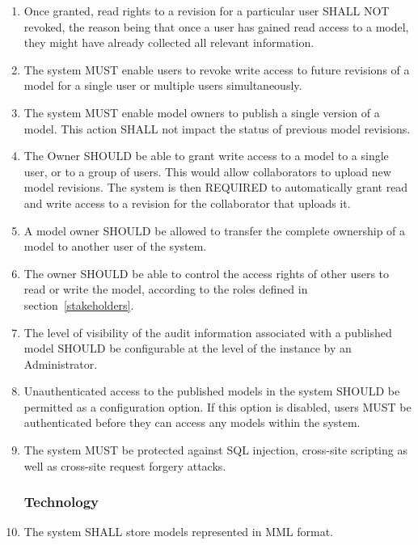 \begin{enumerate}[1]
\item Once granted, read rights to a revision for a particular user SHALL NOT revoked, the reason being that once a user has gained read access to a model, they might have already collected all relevant information.

\item The system MUST enable users to revoke write access to future revisions of a model for a single user or multiple users simultaneously.

\item The system MUST enable model owners to publish a single version of a model. This action SHALL not impact the status of previous model revisions. 

\item The Owner SHOULD be able to grant write access to a model to a single user, or to a group of users. This would allow collaborators to upload new model revisions. The system is then REQUIRED to automatically grant read and write access to a revision for the collaborator that uploads it.

\item A model owner SHOULD be allowed to transfer the complete ownership of a model to another user of the system.

\item The owner SHOULD be able to control the access rights of other users to read or write the model, according to the roles defined in section~\ref{stakeholders}.

\item The level of visibility of the audit information associated with a published model SHOULD be configurable at the level of the instance by an Administrator.

\item Unauthenticated access to the published models in the system SHOULD be permitted as a configuration option. If this option is disabled, users MUST be authenticated before they can access any models within the system.

\item The system MUST be protected against SQL injection, cross-site scripting as well as cross-site request forgery attacks. 

\subsubsection{Technology}
\item The system SHALL store models represented in MML format.


\end{enumerate}
